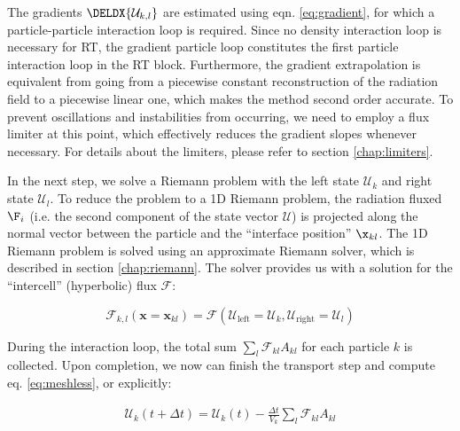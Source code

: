 The gradients $\DELDX{\mathcal{U}_{k,l}}$ are estimated using eqn. \ref{eq:gradient}, for which a 
particle-particle interaction loop is required. Since no density interaction loop is necessary for 
RT, the gradient particle loop constitutes the first particle interaction loop in the RT block.
Furthermore, the gradient extrapolation is equivalent from going from a piecewise constant 
reconstruction of the radiation field to a piecewise linear one, which makes the method second 
order accurate. To prevent oscillations and instabilities from occurring, we need to employ a flux 
limiter at this point, which effectively reduces the gradient slopes whenever necessary.
For details about the limiters, please refer to section \ref{chap:limiters}.


In the next step, we solve a Riemann problem with the left state $\mathcal{U}_k$ and right state 
$\mathcal{U}_l$. To reduce the problem to a 1D Riemann problem, the radiation fluxed $\F_i$ (i.e. 
the second component of the state vector $\mathcal{U}$) is projected along the normal vector 
between the particle and the ``interface position'' $\x_{kl}$. The 1D Riemann problem is solved 
using an approximate Riemann solver, which is described in section \ref{chap:riemann}. The solver 
provides us with a solution for the ``intercell'' (hyperbolic) flux $\mathcal{F}$:

\begin{equation}
	\mathcal{F}_{k, l}(\mathbf{x} =
        \mathbf{x}_{kl}) = \mathcal{F}\left( \mathcal{U}_{\text{left}} = \mathcal{U}_{k}, 
\mathcal{U}_{\text{right}} = \mathcal{U}_l \right)
\end{equation}

During the interaction loop, the total sum $\sum_l \mathcal{F}_{kl} A_{kl}$ for each particle 
$k$ is collected. Upon completion, we now can finish the transport step and compute eq. 
\ref{eq:meshless}, or explicitly:

\begin{align}
	\mathcal{U}_k(t + \Delta t) = \mathcal{U}_k (t) - \frac{\Delta t}{V_k} \sum\limits_{l} \mathcal 
F_{kl} A_{kl} \label{eq:transport-update-explicit}
\end{align}








